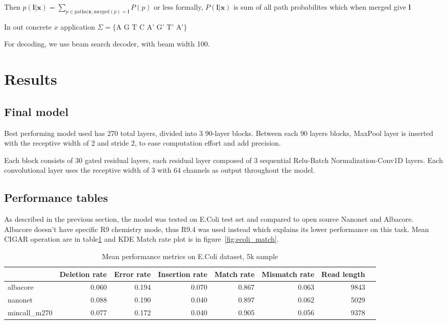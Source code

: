 \documentclass[runningheads,a4paper]{llncs}
\begin{document}
Then $p(\mathbf{l}|\mathbf{x}) = \sum_{p\in\text{paths}(\mathbf{x}, \text{merged}(p) = \mathbf{l}}{P(p)}$ or less formally, $P(\mathbf{l}|\mathbf{x})$ is sum of all path probabilites which when merged give $\mathbf{l}$

In out concrete $x$ application $\Sigma = \{\text{A G T C A' G' T' A'}\}$

For decoding, we use beam search decoder, with beam width 100.

\section{Results}

\subsection{Final model}

Best performing model used has 270 total layers, divided into 3 90-layer blocks. Between each 90 layers blocks, MaxPool layer is inserted with the receptive width of 2 and stride 2, to ease computation effort and add precision.

Each block consists of 30 gated residual layers, each residual layer composed of 3 sequential Relu-Batch Normalization-Conv1D layers. Each convolutional layer uses the receptive width of 3 with 64 channels as output throughout the model.

\subsection{Performance tables}

As described in the previous section, the model was tested on E.Coli test set and compared to open source Nanonet and Albacore. Albacore doesn't have specific R9 chemistry mode, thus R9.4 was used instead which explains its lower performance on this task. Mean CIGAR operation are in table\ref{table:1} and KDE Match rate plot is in figure~\ref{fig:ecoli_match}.


\begin{table}[h!]
\centering
\begin{tabular}{lrrrrrrr}
\toprule
{} &  Deletion rate &  Error rate &  Insertion rate &  Match rate &  Mismatch rate &  Read length\\
\midrule
albacore     &       0.060 &    0.194 &        0.070 &    0.867 &       0.063 &  9843 \\
nanonet      &       0.088 &    0.190 &        0.040 &    0.897 &       0.062 &  5029 \\
mincall\_m270 &       0.077 &    0.172 &        0.040 &   0.905 &       0.056 &  9378 \\
\bottomrule
\end{tabular}

\caption{Mean performance metrics on E.Coli dataset, 5k sample}
\label{table:1}
\end{table}
\end{document}
